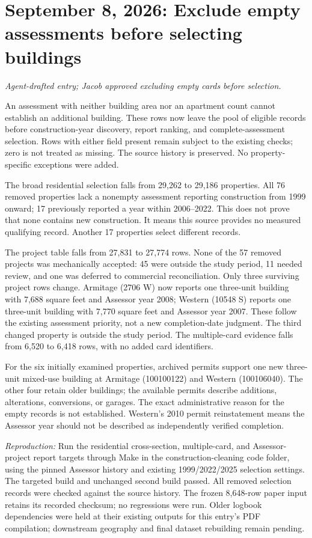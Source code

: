 \section*{September 8, 2026: Exclude empty assessments before selecting buildings}
\textit{Agent-drafted entry; Jacob approved excluding empty cards before selection.}

An assessment with neither building area nor an apartment count cannot establish
an additional building. These rows now leave the pool of eligible records before
construction-year discovery, report ranking, and complete-assessment selection.
Rows with either field present remain subject to the existing checks; zero is
not treated as missing. The source history is preserved. No property-specific
exceptions were added.

The broad residential selection falls from 29,262 to 29,186 properties. All 76
removed properties lack a nonempty assessment reporting construction from 1999
onward; 17 previously reported a year within 2006--2022. This does not prove
that none contains new construction. It means this source provides no measured
qualifying record. Another 17 properties select different records.

The project table falls from 27,831 to 27,774 rows. None of the 57 removed
projects was mechanically accepted: 45 were outside the study period, 11 needed
review, and one was deferred to commercial reconciliation. Only three surviving
project rows change. Armitage (2706 W) now reports one three-unit building with
7,688 square feet and Assessor year 2008; Western (10548 S) reports one three-unit
building with 7,770 square feet and Assessor year 2007. These follow the existing
assessment priority, not a new completion-date judgment. The third changed
property is outside the study period. The multiple-card evidence falls from
6,520 to 6,418 rows, with no added card identifiers.

For the six initially examined properties, archived permits support one new
three-unit mixed-use building at Armitage (100100122) and Western (100106040).
The other four retain older buildings; the available permits describe additions,
alterations, conversions, or garages. The exact administrative reason for the
empty records is not established. Western's 2010 permit reinstatement means the
Assessor year should not be described as independently verified completion.

\textit{Reproduction:} Run the residential cross-section, multiple-card, and
Assessor-project report targets through Make in the construction-cleaning code
folder, using the pinned Assessor history and existing 1999/2022/2025 selection
settings. The targeted build and unchanged second build passed. All removed
selection records were checked against the source history. The frozen 8,648-row
paper input retains its recorded checksum; no regressions were run. Older
logbook dependencies were held at their existing outputs for this entry's PDF
compilation; downstream geography and final dataset rebuilding remain pending.
